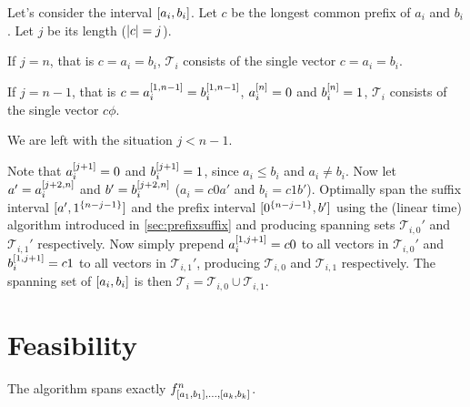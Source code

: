 Let's consider the interval $[a_i, b_i]$.
Let $c$ be the longest common prefix of $a_i$ and $b_i$.
Let $j$ be its length ($\lvert c\rvert = j$).

If $j = n$, that is $c = a_i = b_i$,
$\mathcal{T}_i$ consists of the single vector
$c = a_i = b_i$.

If $j = n-1$,
that is $c = a_i^{[1, n-1]} = b_i^{[1, n-1]}$,
$a_i^{[n]} = 0$ and $b_i^{[n]} = 1$,
$\mathcal{T}_i$ consists of the single vector
$c \phi$.

We are left with the situation $j < n-1$.

Note that $a_i^{[j+1]} = 0$ and $b_i^{[j+1]} = 1$,
since $a_i \leq b_i$ and $a_i \neq b_i$.
Now let $a' = a_i^{[j+2, n]}$
and $b' = b_i^{[j+2, n]}$
($a_i = c 0 a'$ and $b_i = c 1 b'$).
Optimally span the suffix interval
$[a', 1^{\{n-j-1\}}]$
and the prefix interval
$[0^{\{n-j-1\}}, b']$
using the (linear time)
algorithm
introduced in \autoref{sec:prefixsuffix}
and producing spanning sets
$\mathcal{T}_{i, 0}'$
and $\mathcal{T}_{i, 1}'$ respectively.
Now simply prepend $a_i^{[1, j+1]} = c 0$
to all vectors in $\mathcal{T}_{i, 0}'$
and $b_i^{[1, j+1]} = c 1$
to all vectors in $\mathcal{T}_{i, 1}'$,
producing $\mathcal{T}_{i, 0}$
and $\mathcal{T}_{i, 1}$ respectively.
The spanning set of $[a_i, b_i]$
is then
$\mathcal{T}_i
= \mathcal{T}_{i, 0} \cup \mathcal{T}_{i, 1}$.


\section{Feasibility}
\begin{theorem}
The algorithm spans exactly
$f^n_{[a_1, b_1], \ldots, [a_k, b_k]}$.
\end{theorem}

